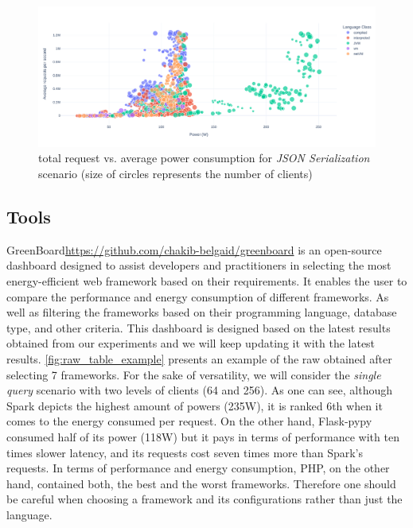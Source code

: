 \begin{figure}[!h]
    \centering
    \includegraphics[width=\textwidth,height=\textheight,keepaspectratio]{imgs/power_requests_json}
    \caption{total request vs. average power consumption for \emph{JSON Serialization} scenario (size of circles represents the number of clients)}
    \label{fig:power_requests_json}
\end{figure}

\subsection{Tools}\label{sec:tools}
\textsf{GreenBoard}\url{https://github.com/chakib-belgaid/greenboard} is an open-source dashboard designed to assist developers and practitioners in selecting the most energy-efficient web framework based on their requirements.
It enables the user to compare the performance and energy consumption of different frameworks. As well as filtering the frameworks based on their programming language, database type, and other criteria.
This dashboard is designed based on the latest results obtained from our experiments and we will keep updating it with the latest results.
\cref*{fig:raw_table_example} presents an example of the raw obtained after selecting 7 frameworks. For the sake of versatility, we will consider the \emph{single query} scenario with two levels of clients (64 and 256).
As one can see, although \textsf{Spark} depicts the highest amount of powers (235W), it is ranked 6th when it comes to the energy consumed per request. On the other hand, \textsf{Flask-pypy} consumed half of its power (118W) but it pays in terms of performance with ten times slower latency, and its requests cost seven times more than \textsf{Spark's} requests.
In terms of performance and energy consumption, PHP, on the other hand, contained both, the best and the worst frameworks. Therefore one should be careful when choosing a framework and its configurations rather than just the language.

